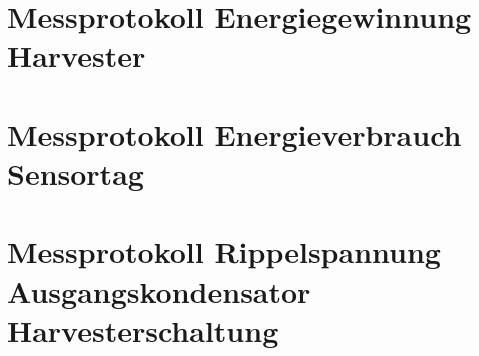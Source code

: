 \chapter{Messprotokoll Energiegewinnung Harvester}\label{anhang_messprotokoll_energie_harvester} 



\chapter{Messprotokoll Energieverbrauch Sensortag}\label{anhang_messprotokoll_energie_sensortag} 
%

\chapter{Messprotokoll Rippelspannung Ausgangskondensator Harvesterschaltung}\label{anhang_messprotokoll_kondensator_harvester} 
